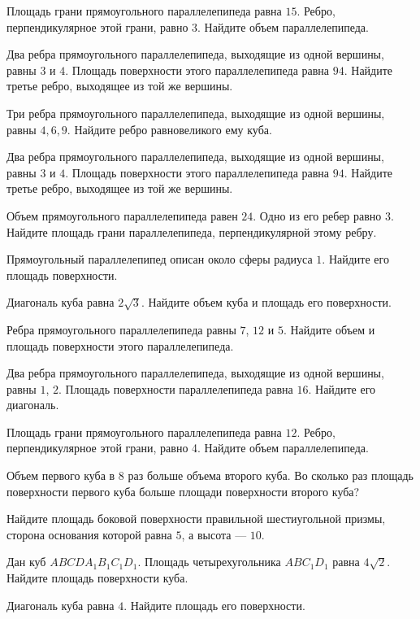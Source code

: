 \begin{class}[number=1]
\begin{listofex}
		
		\item Площадь грани прямоугольного параллелепипеда равна \( 15 \). Ребро, перпендикулярное этой грани, равно \(3\). Найдите объем параллелепипеда.
		\item Два ребра прямоугольного параллелепипеда, выходящие из одной вершины, равны \(3\) и \(4\). Площадь поверхности этого параллелепипеда равна \(94\). Найдите третье ребро, выходящее из той же вершины.
		\item Три ребра прямоугольного параллелепипеда, выходящие из одной вершины, равны \(4, 6, 9\). Найдите ребро равновеликого ему куба.
		\item Два ребра прямоугольного параллелепипеда, выходящие из одной вершины, равны \(3\) и \(4\). Площадь поверхности этого параллелепипеда равна \(94\). Найдите третье ребро, выходящее из той же вершины.
		\item Объем прямоугольного параллелепипеда равен \(24\). Одно из его ребер равно \(3\). Найдите площадь грани параллелепипеда, перпендикулярной этому ребру.
		\item Прямоугольный параллелепипед описан около сферы радиуса \(1\). Найдите его площадь поверхности.
		\item Диагональ куба равна \( 2\sqrt{3} \). Найдите объем куба и площадь его поверхности.
		\item Ребра прямоугольного параллелепипеда равны \( 7 \), \( 12 \) и \( 5 \). Найдите объем и площадь поверхности этого параллелепипеда.
		\item Два ребра прямоугольного параллелепипеда, выходящие из одной вершины, равны \( 1 \), \( 2 \). Площадь поверхности параллелепипеда равна \( 16 \). Найдите его диагональ.
		\item Площадь грани прямоугольного параллелепипеда равна \( 12 \). Ребро, перпендикулярное этой грани, равно 4. Найдите объем параллелепипеда.
		\item Объем первого куба в \( 8 \) раз больше объема второго куба. Во сколько раз площадь поверхности первого куба больше площади поверхности второго куба?
		\item Найдите площадь боковой поверхности правильной шестиугольной призмы, сторона основания которой равна \( 5 \), а высота  --- \( 10 \).
		\item Дан куб \( ABCDA_1B_1C_1D_1 \). Площадь четырехугольника \( ABC_1D_1 \) равна \( 4\sqrt{2} \). Найдите площадь поверхности куба.
		\item Диагональ куба равна \( 4 \). Найдите площадь его поверхности.
	\end{listofex}
\end{class}

